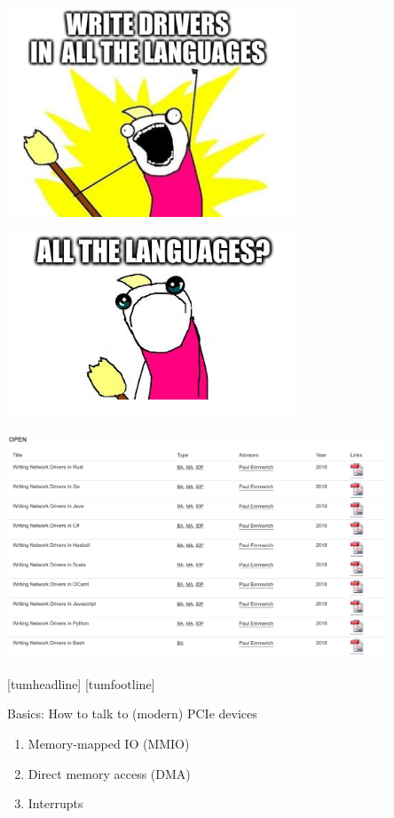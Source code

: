 \documentclass[NET,english,aspectratio=43,notitleframe]{tumbeamer}
\begin{document}
\begin{frame}{}
\centering\includegraphics[width=0.65\textwidth]{pics/allthe1}
\end{frame}

\begin{frame}{}
\centering\includegraphics[width=0.65\textwidth]{pics/allthe2}
\end{frame}

\begin{frame}{}
\centering\includegraphics[width=0.85\textwidth]{pics/theses}
\end{frame}
[tumheadline]
[tumfootline]


\begin{frame}{Basics: How to talk to (modern) PCIe devices}
\begin{enumerate}
\item Memory-mapped IO (MMIO)
\item Direct memory access (DMA)
\item Interrupts
\end{enumerate}
\end{frame}
\end{document}
